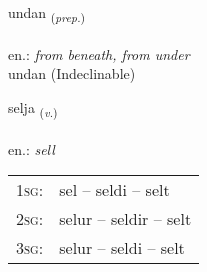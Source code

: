 \documentclass[frontgrid, backgrid]{flacards}\usepackage[]{graphicx}\usepackage[]{xcolor}
\begin{document}
\renewcommand{\flhead}{\vskip5pt \fboxsep=0pt {\small\bfseries\footnotesize Forsetning | Preposition}}
\renewcommand{\fcfoot}{\vskip5pt \fboxsep=0pt \hspace{2pt}{\small\bfseries\footnotesize 1K}}

\renewcommand{\blhead}{\vskip5pt {\small\bfseries\footnotesize Forsetning | Preposition }}
\renewcommand{\bcfoot}{\vskip5pt \hspace{2pt}{\small\bfseries\footnotesize 1K}}


{undan \small{\textsubscript{(\textit{prep.})}} \\[1ex]
\textphonetic{[ʏntan]} \\
en.: \emph{from beneath, from under} \\  [2ex]
undan (Indeclinable)}

\renewcommand{\flhead}{\vskip5pt \fboxsep=0pt {\small\bfseries\footnotesize Sagnorð | Verb}}
\renewcommand{\fcfoot}{\vskip5pt \fboxsep=0pt \hspace{2pt}{\small\bfseries\footnotesize 1K}}

\renewcommand{\blhead}{\vskip5pt {\small\bfseries\footnotesize Sagnorð | Verb }}
\renewcommand{\bcfoot}{\vskip5pt \hspace{2pt}{\small\bfseries\footnotesize 1K}}


{selja \small{\textsubscript{(\textit{v.})}} \\[1ex] %
\textphonetic{[sɛlja]} \\
en.: \emph{sell} \\  [2ex]
\renewcommand*{\arraystretch}{0.8}
\begin{tabular}{p{1cm}l}
\textsc{1sg}: & sel -- seldi -- selt \\ 
\textsc{2sg}: & selur -- seldir -- selt \\ 
\textsc{3sg}: & selur -- seldi -- selt \\ 
\end{tabular}
}

\renewcommand{\flhead}{\vskip5pt \fboxsep=0pt {\small\bfseries\footnotesize Nafnorð | Noun}}
\renewcommand{\fcfoot}{\vskip5pt \fboxsep=0pt \hspace{2pt}{\small\bfseries\footnotesize 1K}}
\end{document}
